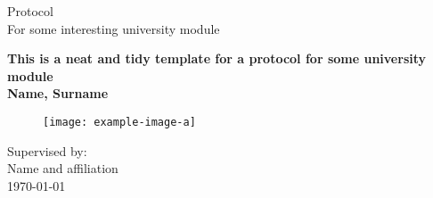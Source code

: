 \begin{titlepage}
\begin{center}

\vspace*{0.5cm}
\Large
Protocol\\
For some interesting university module\\
\vspace{1cm}

\Huge
\textbf{This is a neat and tidy template for a protocol for some university module}\\
\Large
\vspace{1cm}
\textbf{Name, Surname}
\vspace{1cm}

\begin{figure}[ht]
     \centering
     \texttt{[image: example-image-a]}
\end{figure}
\vfill

\large
\vspace{0.5cm}
Supervised by:\\
\vspace{0.5cm}
Name and affiliation \\
\vspace{1cm}
\today \\
\vspace{0.5cm}

        
\end{center}
\end{titlepage}
